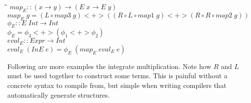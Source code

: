 \documentclass[10pt]{article}
\newlength{\lwidth}\setlength{\lwidth}{4.5cm}
\newlength{\cwidth}\setlength{\cwidth}{8mm} %
\newcommand{\Conid}[1]{\mathit{#1}}
\newcommand{\Varid}[1]{\mathit{#1}}
\begin{document}
\begin{tabbing}
\qquad\=\hspace{\lwidth}\=\hspace{\cwidth}\=\+\kill
${\Varid{map}_E\mathbin{::}(\Varid{x}\to \Varid{y})\to (\Conid{E}\;\Varid{x}\to \Conid{E}\;\Varid{y})}$\\
${\Varid{map}_E\;\Varid{g}\mathrel{=}(\Conid{L}\mathbin{\circ}\Varid{map3}\;\Varid{g})\mathbin{<+>}((\Conid{R}\mathbin{\circ}\Conid{L}\mathbin{\circ}\Varid{map1}\;\Varid{g})\mathbin{<+>}(\Conid{R}\mathbin{\circ}\Conid{R}\mathbin{\circ}\Varid{map2}\;\Varid{g}))}$\\
${}$\\
${\Varid{\phi}_E\mathbin{::}\Conid{E}\;\Conid{Int}\to \Conid{Int}}$\\
${\Varid{\phi}_E\mathrel{=}\Varid{\phi_3}\mathbin{<+>}(\Varid{\phi_1}\mathbin{<+>}\Varid{\phi_2})}$\\
${}$\\
${\Varid{eval}_E\mathbin{::}\Conid{Expr}\to \Conid{Int}}$\\
${\Varid{eval}_E\;(\Conid{InE}\;\Varid{e})\mathrel{=}\Varid{\phi}_E\;(\Varid{map}_E\;\Varid{eval}_E\;\Varid{e})}$
\end{tabbing}
Following are more examples the integrate multiplication.  Note how
\ensuremath{\Conid{R}} and \ensuremath{\Conid{L}} must be used together to construct some terms.  This is
painful without a concrete syntax to compile from, but simple when
writing compilers that automatically generate structures.
\end{document}
